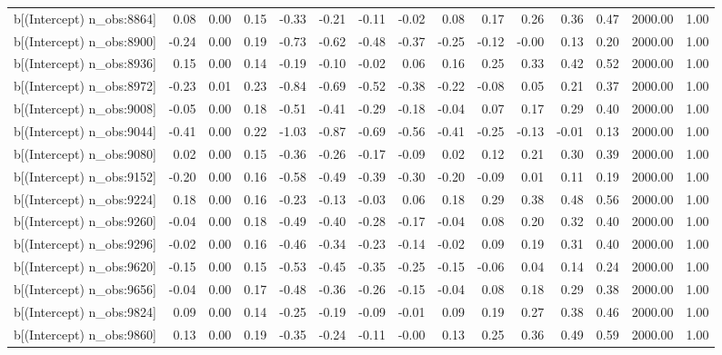 \begin{table}[ht]
\begin{tabular}{rrrrrrrrrrrrrrr}
  b[(Intercept) n\_obs:8864] & 0.08 & 0.00 & 0.15 & -0.33 & -0.21 & -0.11 & -0.02 & 0.08 & 0.17 & 0.26 & 0.36 & 0.47 & 2000.00 & 1.00 \\ 
  b[(Intercept) n\_obs:8900] & -0.24 & 0.00 & 0.19 & -0.73 & -0.62 & -0.48 & -0.37 & -0.25 & -0.12 & -0.00 & 0.13 & 0.20 & 2000.00 & 1.00 \\ 
  b[(Intercept) n\_obs:8936] & 0.15 & 0.00 & 0.14 & -0.19 & -0.10 & -0.02 & 0.06 & 0.16 & 0.25 & 0.33 & 0.42 & 0.52 & 2000.00 & 1.00 \\ 
  b[(Intercept) n\_obs:8972] & -0.23 & 0.01 & 0.23 & -0.84 & -0.69 & -0.52 & -0.38 & -0.22 & -0.08 & 0.05 & 0.21 & 0.37 & 2000.00 & 1.00 \\ 
  b[(Intercept) n\_obs:9008] & -0.05 & 0.00 & 0.18 & -0.51 & -0.41 & -0.29 & -0.18 & -0.04 & 0.07 & 0.17 & 0.29 & 0.40 & 2000.00 & 1.00 \\ 
  b[(Intercept) n\_obs:9044] & -0.41 & 0.00 & 0.22 & -1.03 & -0.87 & -0.69 & -0.56 & -0.41 & -0.25 & -0.13 & -0.01 & 0.13 & 2000.00 & 1.00 \\ 
  b[(Intercept) n\_obs:9080] & 0.02 & 0.00 & 0.15 & -0.36 & -0.26 & -0.17 & -0.09 & 0.02 & 0.12 & 0.21 & 0.30 & 0.39 & 2000.00 & 1.00 \\ 
  b[(Intercept) n\_obs:9152] & -0.20 & 0.00 & 0.16 & -0.58 & -0.49 & -0.39 & -0.30 & -0.20 & -0.09 & 0.01 & 0.11 & 0.19 & 2000.00 & 1.00 \\ 
  b[(Intercept) n\_obs:9224] & 0.18 & 0.00 & 0.16 & -0.23 & -0.13 & -0.03 & 0.06 & 0.18 & 0.29 & 0.38 & 0.48 & 0.56 & 2000.00 & 1.00 \\ 
  b[(Intercept) n\_obs:9260] & -0.04 & 0.00 & 0.18 & -0.49 & -0.40 & -0.28 & -0.17 & -0.04 & 0.08 & 0.20 & 0.32 & 0.40 & 2000.00 & 1.00 \\ 
  b[(Intercept) n\_obs:9296] & -0.02 & 0.00 & 0.16 & -0.46 & -0.34 & -0.23 & -0.14 & -0.02 & 0.09 & 0.19 & 0.31 & 0.40 & 2000.00 & 1.00 \\ 
  b[(Intercept) n\_obs:9620] & -0.15 & 0.00 & 0.15 & -0.53 & -0.45 & -0.35 & -0.25 & -0.15 & -0.06 & 0.04 & 0.14 & 0.24 & 2000.00 & 1.00 \\ 
  b[(Intercept) n\_obs:9656] & -0.04 & 0.00 & 0.17 & -0.48 & -0.36 & -0.26 & -0.15 & -0.04 & 0.08 & 0.18 & 0.29 & 0.38 & 2000.00 & 1.00 \\ 
  b[(Intercept) n\_obs:9824] & 0.09 & 0.00 & 0.14 & -0.25 & -0.19 & -0.09 & -0.01 & 0.09 & 0.19 & 0.27 & 0.38 & 0.46 & 2000.00 & 1.00 \\ 
  b[(Intercept) n\_obs:9860] & 0.13 & 0.00 & 0.19 & -0.35 & -0.24 & -0.11 & -0.00 & 0.13 & 0.25 & 0.36 & 0.49 & 0.59 & 2000.00 & 1.00 \\ 

\end{tabular}
\end{table}

